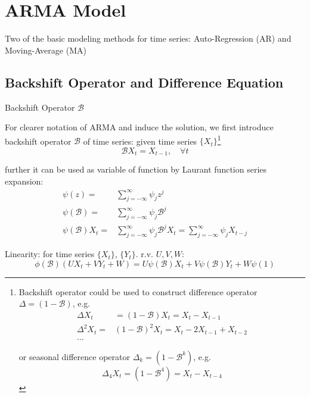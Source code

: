         


\section{ARMA Model}
    Two of the basic modeling methods for time series: Auto-Regression (AR) and Moving-Average (MA)
    
\subsection{Backshift Operator and Difference Equation}

\begin{point}
    Backshift Operator $ \mathscr{B}  $
\end{point}

    For clearer notation of ARMA and induce the solution, we first introduce backshift operator $ \mathscr{B}  $ of time series: given time series $ \{X_t\} $\footnote{Backshift operator could be used to construct difference operator $ \Delta =(1-\mathscr{B} ) $, e.g.
    \begin{align}
        \Delta X_t&=(1-\mathscr{B} )X_t=X_t-X_{t-1}\\
        \Delta ^2X_t=&(1-\mathscr{B} )^2X_t=X_t-2X_{t-1}+X_{t-2}\\
        \ldots&
    \end{align}
    
    or seasonal difference operator $ \Delta _k=(1-\mathscr{B} ^k) $, e.g.
    \begin{equation}
        \Delta _4X_t=(1-\mathscr{B} ^4)=X_t-X_{t-4} 
    \end{equation}
    
    }
    \begin{equation}
         \mathscr{B} X_t=X_{t-1},\quad \forall t
    \end{equation}
    
    further it can be used as variable of function by Laurant function series expansion:
    \begin{align}
        \psi (z)=&\sum_{j=-\infty}^\infty \psi _{j}z^j\\
        \psi (\mathscr{B} )=&\sum_{j=-\infty}^\infty \psi _{j}\mathscr{B}^j \\
        \psi (\mathscr{B} )X_t=&\sum_{j=-\infty}^\infty \psi _{j}\mathscr{B}^jX_t=\sum_{j=-\infty}^\infty \psi _{j}X_{t-j}
    \end{align} 

    Linearity: for time series $ \{X_t\} $, $ \{Y_t\} $. r.v. $ U,V,W $:
    \begin{equation}
        \phi (\mathscr{B} )(UX_t+VY_t+W)=U\psi (\mathscr{B} )X_t+V\psi (\mathscr{B} )Y_t+W\psi (1) 
    \end{equation}

